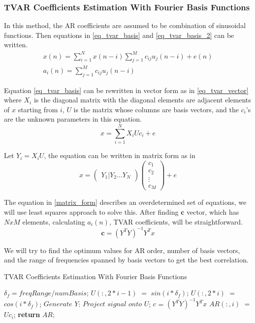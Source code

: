 \subsubsection{TVAR Coefficients Estimation With Fourier Basis Functions}
In this method, the AR coefficients are assumed to be combination of sinusoidal functions. Then equations in \eqref{eq_tvar_basis} and \eqref{eq_tvar_basis_2} can be written.
\begin{align}
x(n) = \sum_{i=1}^{N}{x(n-i)\sum_{j=1}^{M}{c_{ij}u_j(n-i)}} + e(n) 
\label{eq_tvar_basis}\\
a_{i}(n) = \sum_{j=1}^{M}{c_{ij}u_j(n-i)}
\label{eq_tvar_basis_2}
\end{align} \par
Equation \eqref{eq_tvar_basis} can be rewritten in vector form as in \eqref{eq_tvar_vector} where $X_{i}$ is the diagonal matrix with the diagonal elements are adjacent elements of $x$ starting from $i$, $U$ is the matrix whose columns are basis vectors, and the $c_{i}$'s are the unknown parameters in this equation.
\begin{equation} \label{eq_tvar_vector}
	x = \sum_{i=1}^{N}X_{i}Uc_{i} + e
\end{equation} \par
Let $Y_{i} = X_{i}U$, the equation can be written in matrix form as in 
\begin{equation}\label{matrix_form}
x = 
\begin{pmatrix}
Y_{1} | Y_{2}  
\hdots Y_{N}
\end{pmatrix} 
\begin{pmatrix}
c_{1} \\
c_{2} \\
\vdots \\
c_{M}
\end{pmatrix}
+ e
\end{equation} \par
The equation in \eqref{matrix_form} describes an overdetermined set of equations, we will use least squares approach to solve this. After finding {$\textbf{c}$} vector, which has $NxM$ elements, calculating $a_{i}(n)$, TVAR coefficients, will be straightforward.
\begin{equation}
	\textbf{c} = (Y^{T}Y)^{-1}Y^{T}x
\end{equation} \par
We will try to find the optimum values for AR order, number of basis vectors, and the range of frequencies spanned by basis vectors to get the best correlation.
\begin{algorithm}
	\caption{TVAR Coefficients Estimation With Fourier Basis Functions}
	\label{Basis TVAR}
	\begin{algorithmic}[1]
		\State $\delta_f=freqRange/numBasis$;
		\State $U(:,2*i-1)$ $=$ $sin(i*\delta_{f})$;
		\State $U(:,2*i)$ $=$ $cos(i*\delta_{f})$;
		\EndFor
		\State $Generate$ $Y$: $Project$ $signal$ $onto$ $U$;
		\State $c$ = $(Y^{T}Y)^{-1}Y^{T}x$
			\State $AR(:,i)$ $=$ $U$$c_{i}$;
		\EndFor
		\State \textbf{return} $AR$;
		\EndProcedure
	\end{algorithmic}
\end{algorithm}\\
